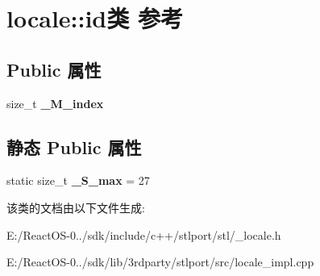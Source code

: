 \hypertarget{classlocale_1_1id}{}\section{locale\+:\+:id类 参考}
\label{classlocale_1_1id}
\subsection*{Public 属性}
\begin{DoxyCompactItemize}
\item 
\mbox{\label{classlocale_1_1id_a27a32e19918af593815b73fcafae2a03}} 
size\+\_\+t {\bfseries \+\_\+\+M\+\_\+index}
\end{DoxyCompactItemize}
\subsection*{静态 Public 属性}
\begin{DoxyCompactItemize}
\item 
\mbox{\label{classlocale_1_1id_adaa81833a7a40a22135e50b5ba5f1045}} 
static size\+\_\+t {\bfseries \+\_\+\+S\+\_\+max} = 27
\end{DoxyCompactItemize}


该类的文档由以下文件生成\+:\begin{DoxyCompactItemize}
\item 
E\+:/\+React\+O\+S-\/0../sdk/include/c++/stlport/stl/\+\_\+locale.\+h\item 
E\+:/\+React\+O\+S-\/0../sdk/lib/3rdparty/stlport/src/locale\+\_\+impl.\+cpp\end{DoxyCompactItemize}
